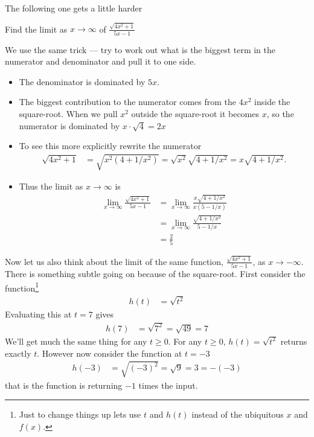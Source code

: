 The following one gets a little harder
\begin{eg}\label{eg lim tricky}
 Find the limit as $x \to \infty$ of $\frac{\sqrt{4x^2+1}}{5x-1}$

We use the same trick --- try to work out what is the biggest term in the
numerator and denominator and pull it to one side.
\begin{itemize}
 \item The denominator is dominated by $5x$.
 \item The biggest contribution to the numerator comes from the $4x^2$ inside
the square-root. When we pull $x^2$ outside the square-root it becomes $x$,
so the numerator is dominated by $x \cdot \sqrt{4} = 2x$
 \item To see this more explicitly rewrite the numerator
\begin{align*}
  \sqrt{4x^2+1} &= \sqrt{x^2 (4+1/x^2)} = \sqrt{x^2} \sqrt{4+1/x^2} =
x\sqrt{4+1/x^2}.
\end{align*}
\item Thus the limit as $x \to \infty$ is
\begin{align*}
 \lim_{x \to \infty} \frac{\sqrt{4x^2+1}}{5x-1}
 &= \lim_{x \to \infty} \frac{x \sqrt{4+1/x^2}}{x(5-1/x)}\\
 &= \lim_{x \to \infty} \frac{\sqrt{4+1/x^2}}{5-1/x} \\
 & = \frac{2}{5}
\end{align*}
\end{itemize}
\end{eg}

Now let us also think about the limit of the same function,
$\frac{\sqrt{4x^2+1}}{5x-1}$, as $x \rightarrow -\infty$. There is something
subtle going on because of the square-root. First consider the
function\footnote{Just to change things up lets use $t$ and $h(t)$ instead of
the ubiquitous $x$ and $f(x)$.}
\begin{align*}
  h(t) &= \sqrt{t^2}
\end{align*}
Evaluating this at $t=7$ gives
\begin{align*}
  h(7) &= \sqrt{ 7^2 } = \sqrt{49} = 7
\end{align*}
We'll get much the same thing for any $t \geq 0$. For any $t \ge 0$, $h(t)=\sqrt{t^2}$
returns exactly $t$. However now consider the function at $t=-3$
\begin{align*}
  h(-3) &= \sqrt{ (-3)^2 } = \sqrt{9} = 3 = - (-3)
\end{align*}
that is the function is returning $-1$ times the input.

